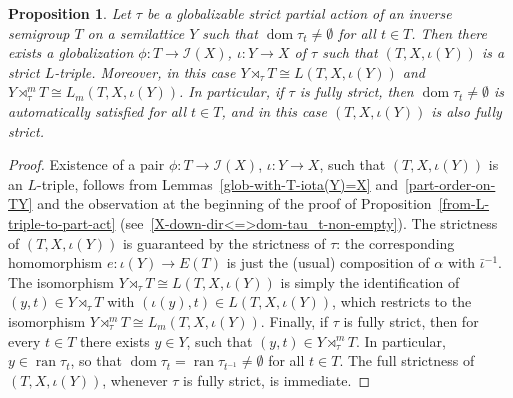 \documentclass[reqno]{amsart}
\newtheorem{prop}[thrm]{Proposition}
\theoremstyle{definition}
\newcommand{\cI}[1]{\mathcal I{(#1)}}
\newcommand{\dom}[1]{\operatorname{\mathrm{dom}}{#1}}
\newcommand{\ran}[1]{\operatorname{\mathrm{ran}}{#1}}
\newcommand{\m}{{}^{-1}}
\newcommand{\0}{\theta}
\newcommand{\io}{\iota}
\newcommand{\af}{\alpha}
\newcommand{\rt}{\rtimes}
\begin{document}
\begin{prop}\label{from-part-act-to-L-triple}
	Let $\tau$ be a globalizable strict partial action of an inverse semigroup $T$ on a semilattice $Y$ such that $\dom{\tau_t}\ne\emptyset$ for all $t\in T$. Then there exists a globalization $\phi:T\to \cI X$, $\io:Y\to X$ of $\tau$ such that $(T,X,\io(Y))$ is a strict $L$-triple. Moreover, in this case $Y\rt_\tau T\cong L(T,X,\io(Y))$ and $Y\rt_\tau^m T\cong L_m(T,X,\io(Y))$. In particular, if $\tau$ is fully strict, then $\dom{\tau_t}\ne\emptyset$ is automatically satisfied for all $t\in T$, and in this case $(T,X,\io(Y))$ is also fully strict.
\end{prop}
\begin{proof}
	Existence of a pair $\phi:T\to \cI X$, $\io:Y\to X$, such that $(T,X,\io(Y))$ is an $L$-triple, follows from Lemmas~\ref{glob-with-T-iota(Y)=X} and~\ref{part-order-on-TY} and the observation at the beginning of the proof of Proposition~\ref{from-L-triple-to-part-act} (see~\eqref{X-down-dir<=>dom-tau_t-non-empty}). The strictness of $(T,X,\io(Y))$ is guaranteed by the strictness of $\tau$: the corresponding homomorphism $e:\io(Y)\to E(T)$ is just the (usual) composition of $\af$ with $\bar\io\m$. The isomorphism $Y\rt_\tau T\cong L(T,X,\io(Y))$ is simply the identification of $(y,t)\in Y\rt_\tau T$ with $(\io(y),t)\in L(T,X,\io(Y))$, which restricts to the isomorphism $Y\rt_\tau^m T\cong L_m(T,X,\io(Y))$. Finally, if $\tau$ is fully strict, then for every $t\in T$ there exists $y\in Y$, such that $(y,t)\in Y\rt_\tau^m T$. In particular, $y\in\ran{\tau_t}$, so that $\dom{\tau_t}=\ran{\tau_{t\m}}\ne\emptyset$ for all $t\in T$. The full strictness of $(T,X,\io(Y))$, whenever $\tau$ is fully strict, is immediate.
\end{proof}
\end{document}

